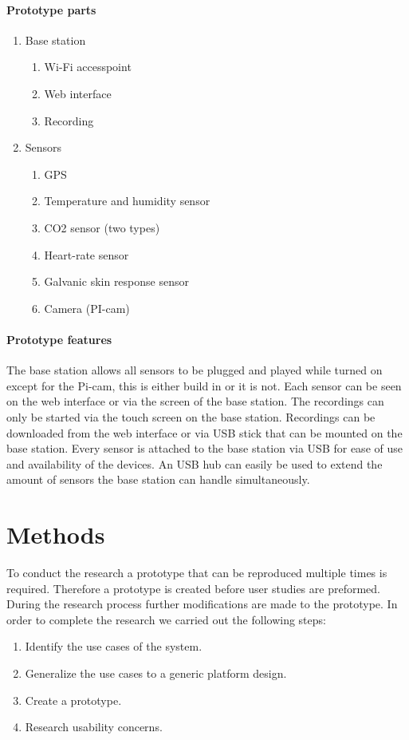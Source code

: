 \documentclass[conference]{IEEEtran}
\begin{document}
	\paragraph{Prototype parts}
		\begin{enumerate}
			\item Base station
				\begin{enumerate}
					\item Wi-Fi accesspoint
					\item Web interface
					\item Recording
				\end{enumerate}
			\item Sensors
				\begin{enumerate}
					\item GPS
					\item Temperature and humidity sensor
					\item CO2 sensor (two types)
					\item Heart-rate sensor
					\item Galvanic skin response sensor
					\item Camera (PI-cam)
				\end{enumerate}
		\end{enumerate}
	\paragraph{Prototype features}
		The base station allows all sensors to be plugged and played while turned on except for the Pi-cam, this is either build in or it is not. Each sensor can be seen on the web interface or via the screen of the base station. The recordings can only be started via the touch screen on the base station. Recordings can be downloaded from the web interface or via USB stick that can be mounted on the base station. Every sensor is attached to the base station via USB for ease of use and availability of the devices. An USB hub can easily be used to extend the amount of sensors the base station can handle simultaneously. 
	\section{Methods}
		To conduct the research a prototype that can be reproduced multiple times is required. Therefore a prototype is created before user studies are preformed. During the research process further modifications are made to the prototype. In order to complete the research we carried out the following steps:
		\begin{enumerate}
			\item Identify the use cases of the system.
			\item Generalize the use cases to a generic platform design.
			\item Create a prototype.
			\item Research usability concerns.
		\end{enumerate}
\end{document}
